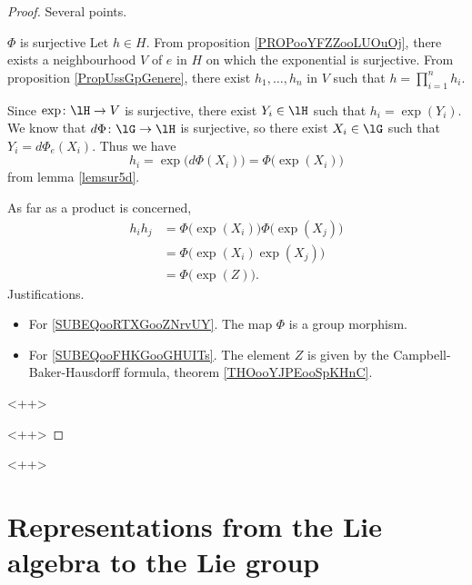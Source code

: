 \begin{proof}
    Several points.
    \begin{subproof}
    \item[\( \Phi\) is surjective]
        Let \( h\in H\). From proposition \ref{PROPooYFZZooLUOuOj}, there exists a neighbourhood \( V\) of \( e\) in \( H\) on which the exponential is surjective. From proposition \ref{PropUssGpGenere}, there exist \( h_1,\ldots, h_n\) in \( V\) such that \( h=\prod_{i=1}^nh_i\).

        Since \( \exp\colon \lH\to V\) is surjective, there exist \( Y_i\in \lH\) such that \( h_i=\exp(Y_i)\). We know that \( d\Phi\colon \lG\to \lH\) is surjective, so there exist \( X_i\in\lG\) such that \( Y_i=d\Phi_e(X_i)\). Thus we have 
        \begin{equation}
            h_i=\exp\big( d\Phi(X_i) \big)=\Phi\big( \exp(X_i) \big)
        \end{equation}
        from lemma \ref{lemsur5d}.

        As far as a product is concerned,
        \begin{subequations}
            \begin{align}
                h_ih_j&=\Phi\big( \exp(X_i) \big)\Phi\big( \exp(X_j) \big)\\
                &=\Phi\big( \exp(X_i)\exp(X_j) \big)    \label{SUBEQooRTXGooZNrvUY}\\
                &=\Phi\big( \exp(Z) \big).      \label{SUBEQooFHKGooGHUITs}
            \end{align}
        \end{subequations}
        Justifications.
        \begin{itemize}
            \item For \eqref{SUBEQooRTXGooZNrvUY}. The map \( \Phi\) is a group morphism.
            \item For \eqref{SUBEQooFHKGooGHUITs}. The element \( Z\) is given by the Campbell-Baker-Hausdorff formula, theorem \ref{THOooYJPEooSpKHnC}.
        \end{itemize}
        <++>
    \end{subproof}
    <++>
\end{proof}
<++>

\section{Representations from the Lie algebra to the Lie group}

